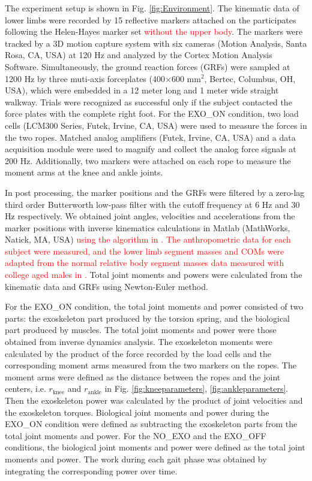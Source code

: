 \documentclass[twocolumn,cleanfoot,10pt]{asme2ej}
\begin{document}
The experiment setup is shown in Fig. \ref{fig:Environment}.
The kinematic data of lower limbs were recorded by 15 reflective markers attached on the participates following the Helen-Hayes marker set \cite{RN24} \textcolor{red}{without the upper body}.
The markers were tracked by a 3D motion capture system with six cameras (Motion Analysis, Santa Rosa, CA, USA) at 120 Hz and analyzed by the Cortex Motion Analysis Software.
Simultaneously, the ground reaction forces (GRFs) were sampled at 1200 Hz by three muti-axis forceplates (400$\times$600 mm$^{2}$, Bertec, Columbus, OH, USA), which were embedded in a 12 meter long and 1 meter wide straight walkway.
Trials were recognized as successful only if the subject contacted the force plates with the complete right foot.
For the EXO\_ON condition, two load cells (LCM300 Series, Futek, Irvine, CA, USA) were used to measure the forces in the two ropes.
Matched analog amplifiers (Futek, Irvine, CA, USA) and a data acquisition module were used to magnify and collect the analog force signals at 200 Hz.
Additionally, two markers were attached on each rope to measure the moment arms at the knee and ankle joints.

In post processing, the marker positions and the GRFs were filtered by a zero-lag third order Butterworth low-pass filter with the cutoff frequency at 6 Hz and 30 Hz respectively.
We obtained joint angles, velocities and accelerations from the marker positions with inverse kinematics calculations in Matlab (MathWorks, Natick, MA, USA) \textcolor{red}{using the algorithm in \cite{RN24}.
The anthropometric data for each subject were measured, and the lower limb segment masses and COMs were adapted from the normal relative body segment masses data measured with college aged males in \cite{de1996adjustments}.}
Total joint moments and powers were calculated from the kinematic data and GRFs using Newton-Euler method. 

For the EXO\_ON condition, the total joint moments and power consisted of two parts: the exoskeleton part produced by the torsion spring, and the biological part produced by muscles.
The total joint moments and power were those obtained from inverse dynamics analysis.
The exoskeleton moments were calculated by the product of the force recorded by the load cells and the corresponding moment arms measured from the two markers on the ropes.
The moment arms were defined as the distance between the ropes and the joint centers, i.e. $r_\mathrm{knee}$ and $r_\mathrm{ankle}$ in Fig. \ref{fig:kneeparameters}, \ref{fig:ankleparameters}.
Then the exoskeleton power was calculated by the product of joint velocities and the exoskeleton torques.
Biological joint moments and power during the EXO\_ON condition were defined as subtracting the exoskeleton parts from the total joint moments and power.
For the NO\_EXO and the EXO\_OFF conditions, the biological joint moments and power were defined as the total joint moments and power.
The work during each gait phase was obtained by integrating the corresponding power over time.
\end{document}
